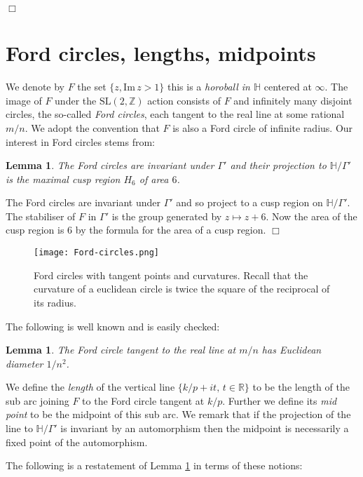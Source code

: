 \documentclass[12pt,a4paper]{amsart}
\newtheorem{lem}[thm]{Lemma}
\def\HH{\mathbb{H}}
\def\im{\mathrm{Im}\,}
\def\xx{\HH/\Gamma'}
\def\ZZ{\mathbb{Z}}
\def\RR{\mathbb{R}}
\def\sl2{\mathrm{SL}(2, \ZZ)}
\begin{document}
\hfill $\Box$


\section{Ford circles, lengths, midpoints} 
\label{lengths}

We denote by $F$ the set  $\{ z, \im z > 1\}$ this is a \textit{horoball in
$\HH$} centered at $\infty$. The image of $F$ under the $\sl2$ action consists
of $F$ and infinitely many disjoint circles, the so-called \textit{Ford
circles}, each tangent to the real line at some rational $m/n$. We adopt the
convention that $F$ is also a Ford circle of infinite radius. Our interest in
Ford circles stems from:

\begin{lem}
The Ford circles are invariant under $\Gamma'$ and their projection to $\xx$ 
is the maximal cusp region $H_6$ of area $6$.
\end{lem}

\proof The Ford circles are invariant under $\Gamma'$ and so project to a cusp
region on $\xx$. The stabiliser of $F$ in $\Gamma'$ is the group generated by
$z \mapsto z + 6$. Now the area of the cusp region is $6$ by the formula for
the area of a cusp region. \hfill $\Box$

\begin{figure}[ht]
\begin{center}
\texttt{[image: Ford-circles.png]} 
\end{center}
\caption{Ford circles with tangent points and curvatures.
Recall that the curvature of a euclidean circle is twice  the square of  the reciprocal of its radius.}
\end{figure}

The following is well known and is easily checked:

\begin{lem}\label{ford}
The Ford circle tangent to the real line at $m/n$
has Euclidean diameter $1/n^2$.
\end{lem}


We define the \textit{length} of the vertical line 
$\{ k/p + i t,\, t \in \RR \}$
to be the length of the  sub arc joining 
$F$ to the Ford circle tangent at $k/p$.
Further we define its  \textit{mid point} to be the midpoint of this sub arc.
We remark that if the projection of the line to $\xx$
is invariant by an automorphism 
then the midpoint is necessarily a fixed point of the automorphism.

The following is a restatement of Lemma \ref{ford} in terms of these notions:
\end{document}
